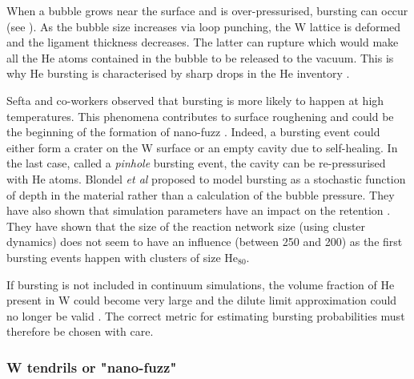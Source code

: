 When a bubble grows near the surface and is over-pressurised, bursting can occur (see ).
As the bubble size increases via loop punching, the W lattice is deformed and the ligament thickness decreases.
The latter can rupture which would make all the He atoms contained in the bubble to be released to the vacuum.
This is why He bursting is characterised by sharp drops in the He inventory .

Sefta and co-workers observed that bursting is more likely to happen at high temperatures.
This phenomena contributes to surface roughening and could be the beginning of the formation of nano-fuzz .
Indeed, a bursting event could either form a crater on the W surface or an empty cavity due to self-healing.
In the last case, called a \textit{pinhole} bursting event, the cavity can be re-pressurised with He atoms.
Blondel \textit{et al} proposed to model bursting as a stochastic function of depth in the material rather than a calculation of the bubble pressure.
They have also shown that simulation parameters have an impact on the retention .
They have shown that the size of the reaction network size (using cluster dynamics) does not seem to have an influence (between 250 and 200) as the first bursting events happen with clusters of size $\text{He}_{80}$.

If bursting is not included in continuum simulations, the volume fraction of He present in W could become very large and the dilute limit approximation could no longer be valid .
The correct metric for estimating bursting probabilities must therefore be chosen with care.

\subsubsection{W tendrils or "nano-fuzz"}

